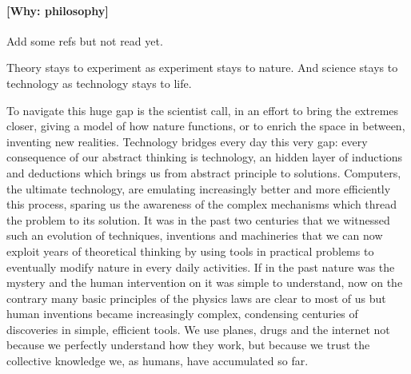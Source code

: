 \documentclass[a4paper,11pt]{extreport}
\begin{document}



\paragraph{[Why: philosophy]} Add some refs but not read yet.

Theory stays to experiment as experiment stays to nature. And science stays to technology as technology stays to life.

To navigate this huge gap is the scientist call, in an effort to bring the extremes closer, giving a model of how nature functions, or to enrich the space in between, inventing new realities. Technology bridges every day this very gap: every consequence of our abstract thinking is technology, an hidden layer of inductions and deductions which brings us from abstract principle to solutions. Computers, the ultimate technology, are emulating increasingly better and more efficiently this process, sparing us the awareness of the complex mechanisms which thread the problem to its solution. It was in the past two centuries that we witnessed such an evolution of techniques, inventions and machineries that we can now exploit years of theoretical thinking by using tools in practical problems to eventually modify nature in every daily activities. If in the past nature was the mystery and the human intervention on it was simple to understand, now on the contrary many basic principles of the physics laws are clear to most of us but human inventions became increasingly complex, condensing centuries of discoveries in simple, efficient tools. We use planes, drugs and the internet not because we perfectly understand how they work, but because we trust the collective knowledge we, as humans, have accumulated so far.
\end{document}
